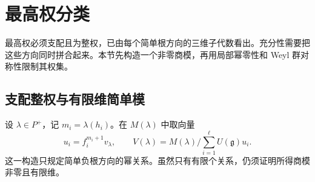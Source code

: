 %
%

\section{最高权分类}
\label{b5:sec:1804}

最高权必须支配且为整权，已由每个简单根方向的三维子代数看出。充分性需要把这些方向同时拼合起来。本节先构造一个非零商模，再用局部幂零性和 Weyl 群对称性限制其权集。

\subsection{支配整权与有限维简单模}
\label{b5:subsec:1804:01}

设 \(\lambda\in P^+\)，记 \(m_i=\lambda(h_i)\)。在 \(M(\lambda)\) 中取向量
\[
	u_i=f_i^{m_i+1}v_\lambda, \qquad V(\lambda)=M(\lambda)\Big/\sum_{i=1}^\ell U(\mathfrak g)u_i.
\]
这一构造只规定简单负根方向的幂关系。虽然只有有限个关系，仍须证明所得商模非零且有限维。

